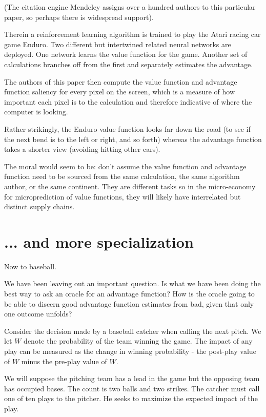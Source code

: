 (The citation engine Mendeley assigns over a hundred authors to this particular paper, so perhaps there is widespread support).  

Therein a reinforcement learning algorithm is trained to play the Atari racing car game Enduro. Two different but intertwined related neural networks are deployed. One network learns the value function for the game. Another set of calculations branches off from the first and separately estimates the advantage.  

The authors of this paper then compute the value function and advantage function saliency for every pixel on the screen, which is a measure of how important each pixel is to the calculation and therefore indicative of where the computer is looking. 

Rather strikingly, the Enduro value function looks far down the road (to see if the next bend is to the left or right, and so forth) whereas the advantage function takes a shorter view (avoiding hitting other cars). 

 
The moral would seem to be: don't assume the value function and advantage function need to be sourced from the same calculation, the same algorithm author, or the same continent. They are different tasks so in the micro-economy for microprediction of value functions, they will likely have interrelated but distinct supply chains. 



\section{... and more specialization}

Now to baseball. 

We have been leaving out an important question. Is what we have been doing the best way to ask an oracle for an advantage function? How is the oracle going to be able to discern good advantage function estimates from bad, given that only one outcome unfolds? 

Consider the decision made by a baseball catcher when calling the next pitch. We let $W$ denote the probability of the team winning the game. The impact of any play can be measured as the change in winning probability - the post-play value of $W$ minus the pre-play value of $W$. 

We will suppose the pitching team has a lead in the game but the opposing team has occupied bases. The count is two balls and two strikes. The catcher must call one of ten plays to the pitcher. He seeks to maximize the expected impact of the play. 

